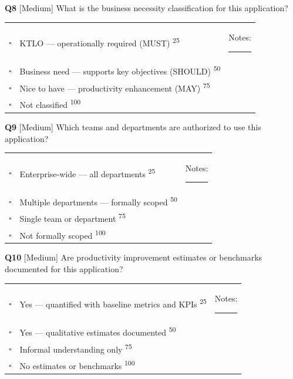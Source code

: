 \documentclass[11pt,landscape]{article}
\begin{document}
\vspace{0.3cm}

\noindent\colorbox{medbg}{\textbf{Q8} [Medium]} What is the business necessity classification for this application?

\begin{tabularx}{\textwidth}{cXX}
$\square$ & KTLO --- operationally required (MUST) \textsuperscript{\scriptsize\textcolor{stridegray}{25}} & Notes: \rule{4cm}{0.4pt} \\
$\square$ & Business need --- supports key objectives (SHOULD) \textsuperscript{\scriptsize\textcolor{stridegray}{50}} &  \\
$\square$ & Nice to have --- productivity enhancement (MAY) \textsuperscript{\scriptsize\textcolor{stridegray}{75}} &  \\
$\square$ & Not classified \textsuperscript{\scriptsize\textcolor{stridegray}{100}} &  \\
\end{tabularx}

\vspace{0.3cm}

\noindent\colorbox{medbg}{\textbf{Q9} [Medium]} Which teams and departments are authorized to use this application?

\begin{tabularx}{\textwidth}{cXX}
$\square$ & Enterprise-wide --- all departments \textsuperscript{\scriptsize\textcolor{stridegray}{25}} & Notes: \rule{4cm}{0.4pt} \\
$\square$ & Multiple departments --- formally scoped \textsuperscript{\scriptsize\textcolor{stridegray}{50}} &  \\
$\square$ & Single team or department \textsuperscript{\scriptsize\textcolor{stridegray}{75}} &  \\
$\square$ & Not formally scoped \textsuperscript{\scriptsize\textcolor{stridegray}{100}} &  \\
\end{tabularx}

\vspace{0.3cm}

\noindent\colorbox{medbg}{\textbf{Q10} [Medium]} Are productivity improvement estimates or benchmarks documented for this application?

\begin{tabularx}{\textwidth}{cXX}
$\square$ & Yes --- quantified with baseline metrics and KPIs \textsuperscript{\scriptsize\textcolor{stridegray}{25}} & Notes: \rule{4cm}{0.4pt} \\
$\square$ & Yes --- qualitative estimates documented \textsuperscript{\scriptsize\textcolor{stridegray}{50}} &  \\
$\square$ & Informal understanding only \textsuperscript{\scriptsize\textcolor{stridegray}{75}} &  \\
$\square$ & No estimates or benchmarks \textsuperscript{\scriptsize\textcolor{stridegray}{100}} &  \\
\end{tabularx}
\end{document}
